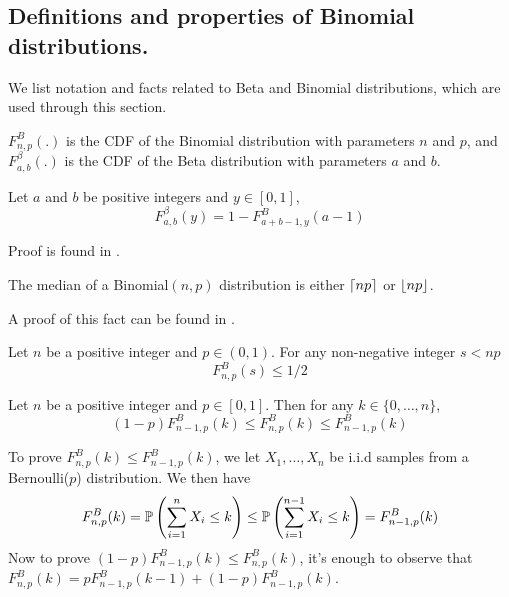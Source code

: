 \subsection{Definitions and properties of Binomial distributions.}
We list notation and facts related to Beta and Binomial distributions, which are used through this section.
\begin{definition}
	$F^B_{n,p}(.)$ is the CDF of the Binomial distribution with parameters $n$ and $p$, and $F^\beta_{a,b}(.)$ is the CDF of the Beta distribution with parameters $a$ and $b$.
\end{definition}

\begin{lemma} \label{fact:equation_for_beta_binomial_cdfs}
	Let $a$ and $b$ be positive integers and $y \in [0,1]$, 
	\[
	F^\beta_{a,b}(y) = 1 - F^B_{a+b-1,y}(a-1)
	\]
\end{lemma}
\begin{myproof}[Proof.]
	Proof is found in \cite{agrawalanalysis}.
\end{myproof}
\begin{lemma} \label{fact:median_of_binomial_dist}
	The median of a Binomial$(n,p)$ distribution is either $\ceil{np}$ or $\floor{np}$.
\end{lemma}
\begin{myproof}[Proof]
	A proof of this fact can be found in \cite{jogdeo1968monotone}.
\end{myproof}

\begin{corollary} \label{cor:corollarly_of_binomial_median_property}
	Let $n$ be a positive integer and $p \in (0,1)$. For any non-negative integer $s < np$
	\[
	F^B_{n,p}(s) \le 1/2
	\]
\end{corollary}

\begin{lemma} \label{fact:relationship_with_binom_cdfs}
	Let $n$ be a positive integer and $p \in [0,1]$. Then for any $k \in \{0,\ldots,n\}$,
	\[
	(1-p)F^B_{n-1,p}(k)\le F^B_{n,p}(k) \le F^B_{n-1,p}(k)
	\] 
\end{lemma}
\begin{myproof}[Proof]
	To prove $F^B_{n,p}(k) \le F^B_{n-1,p}(k)$, we let $X_1,\ldots,X_{n}$ be i.i.d samples from a Bernoulli($p$) distribution. We then have
	\begin{align*}
	F^B_{n,p}(k)  = \P{\sum_{i=1}^{n} X_i \le k}  \le  \P{\sum_{i=1}^{n-1} X_i \le k}  = F^B_{n-1,p}(k)
	\end{align*}
	Now to prove $(1-p)F^B_{n-1,p}(k)\le F^B_{n,p}(k)$, it's enough to observe that $F^B_{n,p}(k) = p F^B_{n-1,p}(k-1) + (1-p) F^B_{n-1,p}(k)$.
\end{myproof}

